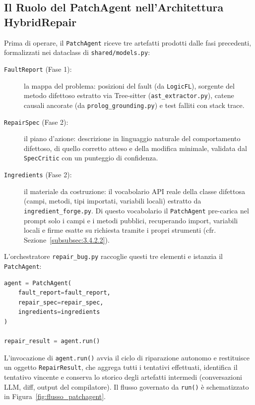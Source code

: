 \subsection{Il Ruolo del PatchAgent nell'Architettura HybridRepair}
\label{subsec:3.4.1}
Prima di operare, il \texttt{PatchAgent} riceve tre artefatti prodotti dalle fasi precedenti, formalizzati nei
dataclass di \texttt{shared/models.py}:

\begin{description}
    \item[\texttt{FaultReport} (Fase 1):] la mappa del problema: posizioni del fault (da \texttt{LogicFL}), sorgente
    del metodo difettoso estratto via Tree-sitter (\texttt{ast\_extractor.py}), catene causali ancorate (da
    \texttt{prolog\_grounding.py}) e test falliti con stack trace.
    \item[\texttt{RepairSpec} (Fase 2):] il piano d'azione: descrizione in linguaggio naturale del comportamento
    difettoso, di quello corretto atteso e della modifica minimale, validata dal \texttt{SpecCritic} con un punteggio
    di confidenza.
    \item[\texttt{Ingredients} (Fase 2):] il materiale da costruzione: il vocabolario API reale della classe
    difettosa (campi, metodi, tipi importati, variabili locali) estratto da \texttt{ingredient\_forge.py}. Di
    questo vocabolario il \texttt{PatchAgent} pre-carica nel prompt solo i campi e i metodi pubblici, recuperando
    import, variabili locali e firme esatte su richiesta tramite i propri strumenti (cfr.
    Sezione~\ref{subsubsec:3.4.2.2}).
\end{description}

L'orchestratore \texttt{repair\_bug.py} raccoglie questi tre elementi e istanzia il \texttt{PatchAgent}:

\begin{lstlisting}[language=Python , label={lst:init_patchagent}]
agent = PatchAgent(
    fault_report=fault_report,
    repair_spec=repair_spec,
    ingredients=ingredients
)

repair_result = agent.run()
\end{lstlisting}

L'invocazione di \texttt{agent.run()} avvia il ciclo di riparazione autonomo e restituisce un oggetto
\texttt{RepairResult}, che aggrega tutti i tentativi effettuati, identifica il tentativo vincente e conserva lo
storico degli artefatti intermedi (conversazioni LLM, diff, output del compilatore). Il flusso governato da
\texttt{run()} è schematizzato in Figura~\ref{fig:flusso_patchagent}.


